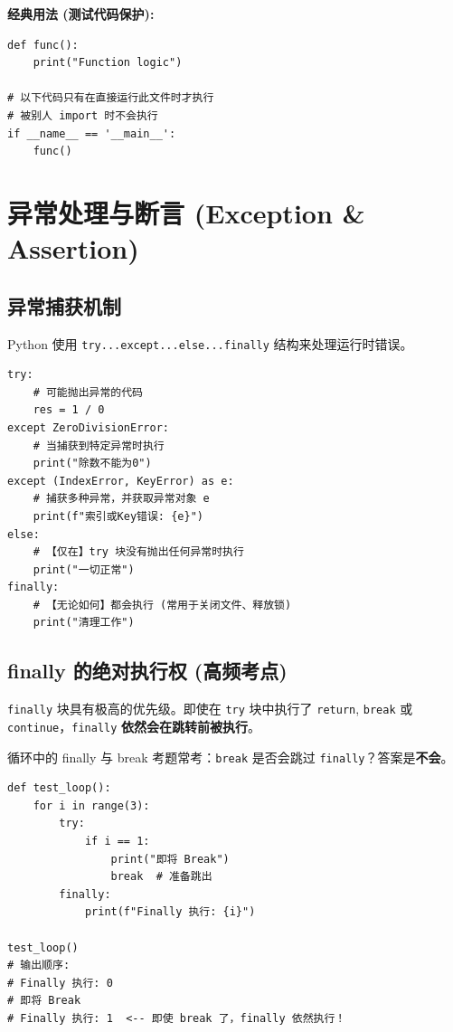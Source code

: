 \documentclass[12pt, a4paper]{article}
\begin{document}
\textbf{经典用法 (测试代码保护):}
\begin{lstlisting}
def func():
    print("Function logic")

# 以下代码只有在直接运行此文件时才执行
# 被别人 import 时不会执行
if __name__ == '__main__':
    func()
\end{lstlisting}

\section{异常处理与断言 (Exception \& Assertion)}

\subsection{异常捕获机制}

Python 使用 \texttt{try...except...else...finally} 结构来处理运行时错误。

\begin{lstlisting}[caption={完整的异常结构}]
try:
    # 可能抛出异常的代码
    res = 1 / 0
except ZeroDivisionError:
    # 当捕获到特定异常时执行
    print("除数不能为0")
except (IndexError, KeyError) as e:
    # 捕获多种异常，并获取异常对象 e
    print(f"索引或Key错误: {e}")
else:
    # 【仅在】try 块没有抛出任何异常时执行
    print("一切正常")
finally:
    # 【无论如何】都会执行 (常用于关闭文件、释放锁)
    print("清理工作")
\end{lstlisting}

\subsection{finally 的绝对执行权 (高频考点)}

\texttt{finally} 块具有极高的优先级。即使在 \texttt{try} 块中执行了 \texttt{return}, \texttt{break} 或 \texttt{continue}，\texttt{finally} \textbf{依然会在跳转前被执行}。

\begin{trapbox}{循环中的 finally 与 break}
考题常考：\texttt{break} 是否会跳过 \texttt{finally}？答案是\textbf{不会}。
\begin{lstlisting}
def test_loop():
    for i in range(3):
        try:
            if i == 1:
                print("即将 Break")
                break  # 准备跳出
        finally:
            print(f"Finally 执行: {i}")

test_loop()
# 输出顺序:
# Finally 执行: 0
# 即将 Break
# Finally 执行: 1  <-- 即使 break 了，finally 依然执行！
\end{lstlisting}
\end{trapbox}
\end{document}
